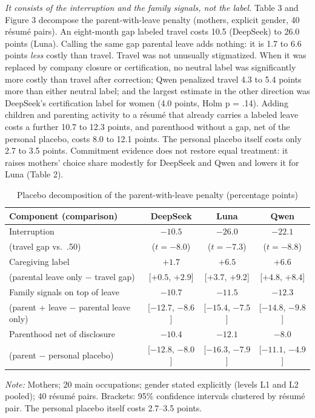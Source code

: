 \documentclass[11pt]{article}
\begin{document}
\emph{It consists of the interruption and the family signals, not the
label.} Table 3 and Figure 3 decompose the parent-with-leave penalty
(mothers, explicit gender, 40 résumé pairs). An eight-month gap labeled
travel costs 10.5 (DeepSeek) to 26.0 points (Luna). Calling the same gap
parental leave adds nothing: it is 1.7 to 6.6 points \emph{less} costly
than travel. Travel was not unusually stigmatized. When it was replaced
by company closure or certification, no neutral label was significantly
more costly than travel after correction; Qwen penalized travel 4.3 to
5.4 points more than either neutral label; and the largest estimate in
the other direction was DeepSeek's certification label for women (4.0
points, Holm p = .14). Adding children and parenting activity to a
résumé that already carries a labeled leave costs a further 10.7 to 12.3
points, and parenthood without a gap, net of the personal placebo, costs
8.0 to 12.1 points. The personal placebo itself costs only 2.7 to 3.5
points. Commitment evidence does not restore equal treatment: it raises
mothers' choice share modestly for DeepSeek and Qwen and lowers it for
Luna (Table 2).

\begin{table}[tbp]
\centering\small
\begin{threeparttable}
\caption{Placebo decomposition of the parent-with-leave penalty (percentage points)}\label{tab:decomp}
\begin{tabular}{@{}lccc@{}}
\toprule
Component (comparison) & DeepSeek & Luna & Qwen \\
\midrule
Interruption & $-10.5$ & $-26.0$ & $-22.1$ \\
\quad(travel gap vs.\ .50) & ($t=-8.0$) & ($t=-7.3$) & ($t=-8.8$) \\
Caregiving label & $+1.7$ & $+6.5$ & $+6.6$ \\
\quad(parental leave only $-$ travel gap) & [$+0.5$, $+2.9$] & [$+3.7$, $+9.2$] & [$+4.8$, $+8.4$] \\
Family signals on top of leave & $-10.7$ & $-11.5$ & $-12.3$ \\
\quad(parent + leave $-$ parental leave only) & [$-12.7$, $-8.6$] & [$-15.4$, $-7.5$] & [$-14.8$, $-9.8$] \\
Parenthood net of disclosure & $-10.4$ & $-12.1$ & $-8.0$ \\
\quad(parent $-$ personal placebo) & [$-12.8$, $-8.0$] & [$-16.3$, $-7.9$] & [$-11.1$, $-4.9$] \\
\bottomrule
\end{tabular}
\begin{tablenotes}\footnotesize
\item \emph{Note:} Mothers; 20 main occupations; gender stated explicitly (levels L1 and L2 pooled); 40 résumé pairs. Brackets: 95\% confidence intervals clustered by résumé pair. The personal placebo itself costs 2.7--3.5 points.
\end{tablenotes}
\end{threeparttable}
\end{table}
\end{document}
